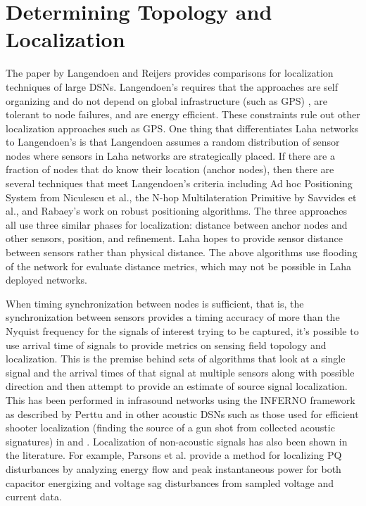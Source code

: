 \section{Determining Topology and Localization}
The paper by Langendoen and Reijers\cite{langendoen2003distributed} provides comparisons for localization techniques of large DSNs. Langendoen's requires that the approaches are self organizing and do not depend on global infrastructure (such as GPS) , are tolerant to node failures, and are energy efficient. These constraints rule out other localization approaches such as GPS. One thing that differentiates Laha networks to Langendoen's is that Langendoen assumes a random distribution of sensor nodes where sensors in Laha networks are strategically placed. If there are a fraction of nodes that do know their location (anchor nodes), then there are several techniques that meet Langendoen's criteria including Ad hoc Positioning System from Niculescu et al.\cite{niculescu2003ad}, the N-hop Multilateration Primitive by Savvides et al.\cite{savvides2002bits}, and Rabaey's work on robust positioning algorithms\cite{rabaey2002robust}. The three approaches all use three similar phases for localization: distance between anchor nodes and other sensors, position, and refinement. Laha hopes to provide sensor distance between sensors rather than physical distance. The above algorithms use flooding of the network for evaluate distance metrics, which may not be possible in Laha deployed networks.

When timing synchronization between nodes is sufficient, that is, the synchronization between sensors provides a timing accuracy of more than the Nyquist frequency for the signals of interest trying to be captured, it's possible to use arrival time of signals to provide metrics on sensing field topology and localization. This is the premise behind sets of algorithms that look at a single signal and the arrival times of that signal at multiple sensors along with possible direction and then attempt to provide an estimate of source signal localization. This has been performed in infrasound networks using the INFERNO framework as described by Perttu\cite{perttu2013regional} and in other acoustic DSNs such as those used for efficient shooter localization (finding the source of a gun shot from collected acoustic signatures) in \cite{gezici2005localization} and \cite{maroti2004shooter}. Localization of non-acoustic signals has also been shown in the literature. For example, Parsons et al. provide a method for localizing PQ disturbances by analyzing energy flow and peak instantaneous power for both capacitor energizing  and voltage sag disturbances from sampled voltage and current data\cite{parsons1998direction}.

